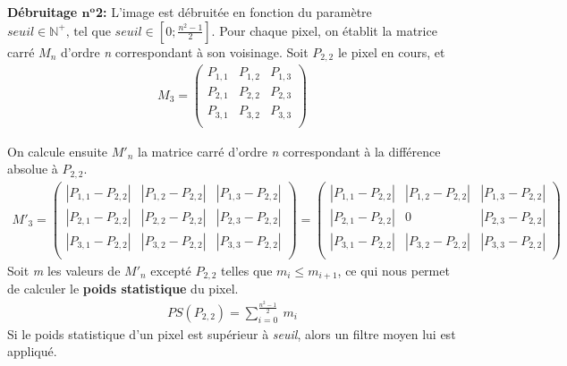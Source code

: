 \documentclass{article}
\newcommand{\N}{\mathbb{N}} %
\begin{document}
		
		\newpage
		
		
		\textbf{Débruitage \begin{math}\textbf{n}^\textbf{o}\end{math}2: }L'image est débruitée en fonction du paramètre \begin{math}seuil \in \N^+ \text{, tel que } seuil \in [0; \frac{n^2-1}{2} ] \end{math}. Pour chaque pixel, on établit la matrice carré \begin{math}M_n\end{math} d'ordre \emph{n} correspondant à son voisinage. Soit \begin{math}P_{2,2}\end{math} le pixel en cours, et
		 \begin{align*}M_{3} = \begin{pmatrix}
			P_{1,1} & P_{1,2} & P_{1,3}\\
			P_{2,1} & P_{2,2} & P_{2,3}\\
			P_{3,1} & P_{3,2} & P_{3,3}\\
		\end{pmatrix}\end{align*}
		
		\noindent On calcule ensuite \begin{math}M'_n\end{math} la matrice carré d'ordre \emph{n} correspondant à la différence absolue à \begin{math}P_{2,2}\end{math}.
		\begin{align*}
			M'_3 =
			\begin{pmatrix}
				|P_{1,1}-P_{2,2}| & |P_{1,2}-P_{2,2}| & |P_{1,3}-P_{2,2}|\\
				|P_{2,1}-P_{2,2}| & |P_{2,2}-P_{2,2}| & |P_{2,3}-P_{2,2}|\\
				|P_{3,1}-P_{2,2}| & |P_{3,2}-P_{2,2}| & |P_{3,3}-P_{2,2}|\\
			\end{pmatrix}
			=
			\begin{pmatrix}
				|P_{1,1}-P_{2,2}| & |P_{1,2}-P_{2,2}| & |P_{1,3}-P_{2,2}|\\
				|P_{2,1}-P_{2,2}| & 0                 & |P_{2,3}-P_{2,2}|\\
				|P_{3,1}-P_{2,2}| & |P_{3,2}-P_{2,2}| & |P_{3,3}-P_{2,2}|\\
			\end{pmatrix}
		\end{align*}
		\noindent Soit \emph{m} les valeurs de \begin{math}M'_n\end{math} excepté \begin{math}P_{2,2}\end{math}  telles que \begin{math}m_i \leq m_{i+1}\end{math}, ce qui nous permet de calculer le \textbf{poids statistique} du pixel.
		\begin{align*}
			PS(P_{2,2}) = \sum_{i=0}^{\frac{n^2-1}{2}}{\ m_i}
		\end{align*}
		Si le poids statistique d'un pixel est supérieur à \emph{seuil}, alors un filtre moyen lui est appliqué.
		
\end{document}
